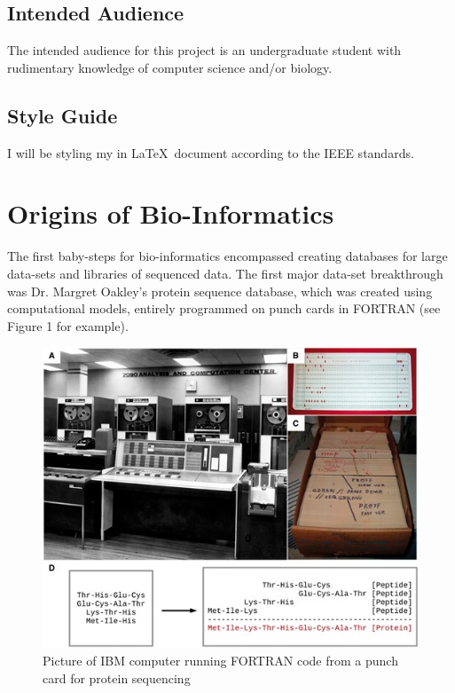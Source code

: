\documentclass[12pt,journal,compsoc]{IEEEtran}
\begin{document}
\subsection{Intended Audience}
The intended audience for this project is an undergraduate student with rudimentary knowledge of computer science and/or biology.

\subsection{Style Guide}
I will be styling my in \LaTeX\ document according to the IEEE standards.

\tableofcontents

\clearpage

\section{Origins of Bio-Informatics}

The first baby-steps for bio-informatics encompassed creating databases for large data-sets and libraries of sequenced data. The first major data-set breakthrough was Dr. Margret Oakley's protein sequence database, which was created using computational models, entirely programmed on punch cards in FORTRAN (see Figure 1 for example).
\begin{figure}[H]
    \centering
    \includegraphics[width=\linewidth]{images/m_bby063f2.jpeg}
    \caption{Picture of IBM computer running FORTRAN code from a punch card for protein sequencing}
    \label{fig:FORTRAN Code}
\end{figure}
\end{document}
